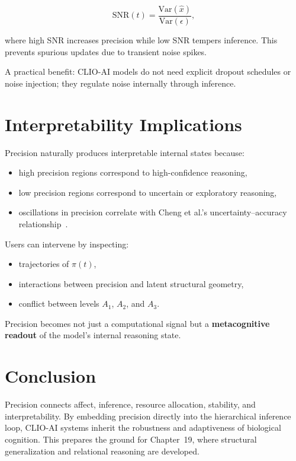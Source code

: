 \documentclass[12pt,oneside]{book}
\theoremstyle{plain}
\theoremstyle{definition}
\let\citep\parencite
\begin{document}
\[
\mathrm{SNR}(t) = \frac{\mathrm{Var}(\hat{x})}{\mathrm{Var}(\epsilon)},
\]

where high SNR increases precision while low SNR tempers inference.
This prevents spurious updates due to transient noise spikes.

A practical benefit: CLIO-AI models do not need explicit dropout schedules or
noise injection; they regulate noise internally through inference.

\section{Interpretability Implications}

Precision naturally produces interpretable internal states because:

\begin{itemize}
    \item high precision regions correspond to high-confidence reasoning,
    \item low precision regions correspond to uncertain or exploratory reasoning,
    \item oscillations in precision correlate with Cheng et al.'s uncertainty–accuracy relationship~\citep{cheng2025cognitive}.
\end{itemize}

Users can intervene by inspecting:

\begin{itemize}
    \item trajectories of $\pi(t)$,
    \item interactions between precision and latent structural geometry,
    \item conflict between levels $A_1$, $A_2$, and $A_3$.
\end{itemize}

Precision becomes not just a computational signal but a
\textbf{metacognitive readout} of the model’s internal reasoning state.

\section{Conclusion}

Precision connects affect, inference, resource allocation, stability, and
interpretability.
By embedding precision directly into the hierarchical inference loop,
CLIO-AI systems inherit the robustness and adaptiveness of biological cognition.
This prepares the ground for Chapter~19, where structural generalization and
relational reasoning are developed.
\end{document}
